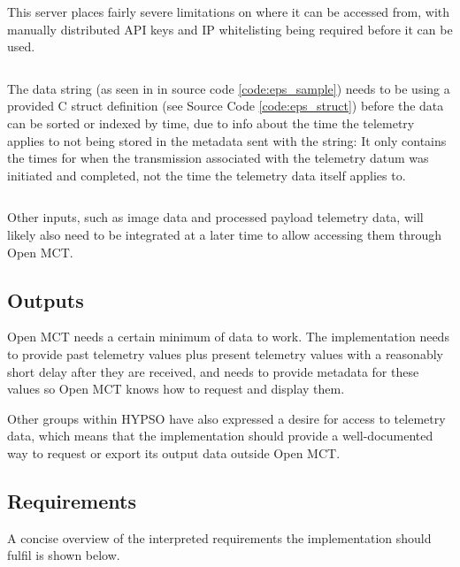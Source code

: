 This server places fairly severe limitations on where it can be accessed from, with manually distributed API keys and IP whitelisting being required before it can be used.

\begin{code}
\inputminted[linenos=true,breaklines=true,bgcolor=codebg]{javascript}{./Code/eps_telemetry_sample_trimmed.json}
\label{code:eps_sample}
\end{code}

The data string (as seen in  in source code \ref{code:eps_sample}) needs to be  using a provided C \gls{struct} definition (see Source Code \ref{code:eps_struct}) before the data can be sorted or indexed by time, due to info about the time the telemetry applies to not being stored in the metadata sent with the string: It only contains the times for when the transmission associated with the telemetry datum was initiated and completed, not the time the telemetry data itself applies to.

\begin{code}
\inputminted[linenos=true,breaklines=true,bgcolor=codebg]{c}{./Code/eps_telemetry_struct_NAEPS001.txt}
\label{code:eps_struct}
\end{code}

Other inputs, such as image data and processed payload telemetry data, will likely also need to be integrated at a later time to allow accessing them through Open MCT.

\subsection{Outputs}
Open MCT needs a certain minimum of data to work. The implementation needs to provide past telemetry values plus present telemetry values with a reasonably short delay after they are received, and needs to provide metadata for these values so Open MCT knows how to request and display them.

Other groups within HYPSO have also expressed a desire for access to telemetry data, which means that the implementation should provide a well-documented way to request or export its output data outside Open MCT.

\subsection{Requirements}
A concise overview of the interpreted requirements the implementation should fulfil is shown below.

